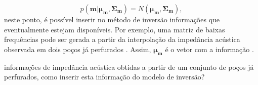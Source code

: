 % 
% 
\begin{equation}
p(\boldsymbol{m}|\boldsymbol{\mu_{m}},\boldsymbol{\Sigma_{m}}) =
N(\boldsymbol{\mu_{m}},\boldsymbol{\Sigma_{m}}),
\end{equation} 
neste ponto, é possível inserir no método de inversão informações 
que eventualmente estejam disponíveis. Por exemplo, uma matriz de baixas frequências pode
ser gerada a partir da interpolação da impedância acústica observada em dois poços
já perfurados \cite{Figueiredo2014}. Assim, $\boldsymbol{\mu_{m}}$ é o vetor com a informação .

informações de impedância acústica obtidas a partir de um conjunto de poços já
perfurados, como inserir esta informação do modelo de inversão?


